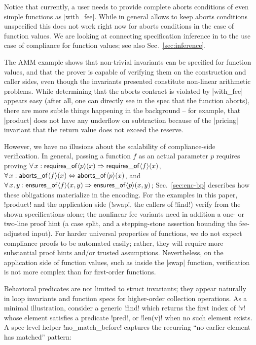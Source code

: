 Notice that currently, a user needs to provide complete aborts conditions of even simple functions as |with_fee|.
While \MVP in general allows to keep aborts conditions unspecified this does not work right now for aborts conditions in the case of function values.
We are looking at connecting specification inference in \MVP to the use case of compliance for function values; see also Sec.~\ref{sec:inference}.

The AMM example shows that non-trivial invariants can be specified for function values, and that the prover is capable of verifying them on the construction and caller sides, even though the invariants presented constitute non-linear arithmetic problems. While determining that the aborts contract is violated by |with_fee| appears easy (after all, one can directly see in the spec that the function aborts), there are more subtle things happening in the background -- for example, that |product| does not have any underflow on subtraction because of the |pricing| invariant that the return value does not exceed the reserve.

However, we have no illusions about the scalability of compliance-side verification.
In general, passing a function $f$ as an actual parameter $p$ requires proving $\forall x: \requiresof{p}{x} \implies \requiresof{f}{x}$, $\forall x: \abortsof{f}{x} \iff \abortsof{p}{x}$, and $\forall x,y: \ensuresof{f}{x, y} \implies \ensuresof{p}{x, y}$; Sec.~\ref{sec:enc-bp} describes how these obligations materialize in the encoding.
For the examples in this paper, !product! and the application side (!swap!, the callers of !find!) verify from the shown specifications alone; the nonlinear fee variants need in addition a one- or two-line proof hint (a case split, and a stepping-stone assertion bounding the fee-adjusted input).
For harder universal properties of functions, we do not expect compliance proofs to be automated easily; rather, they will require more substantial proof hints and/or trusted assumptions.
Nevertheless, on the application side of function values, such as inside the |swap| function, verification is not more complex than for first-order functions.

 \label{sec:find}

Behavioral predicates are not limited to struct invariants; they appear naturally in loop invariants and function specs for higher-order collection operations.
As a minimal illustration, consider a generic !find! which returns the first index of !v! whose element satisfies a predicate !pred!, or !len(v)! when no such element exists.
A spec-level helper !no_match_before! captures the recurring ``no earlier element has matched'' pattern:

